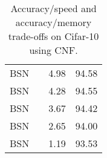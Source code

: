 \begin{table}[]
\begin{tabular}{|llll|}
BSN                         &                       & 4.98                 & 94.58         \\
BSN                         &                       & 4.28                 & 94.55         \\
BSN                         &                       & 3.67                 & 94.42         \\
BSN                         &                       & 2.65                 & 94.00         \\
BSN                         &                       & 1.19                 & 93.53         \\ \hline
\end{tabular}
\caption{Accuracy/speed and accuracy/memory trade-offs on Cifar-10 using CNF.}
\label{cif10_cnf_flop_mem}
\end{table}